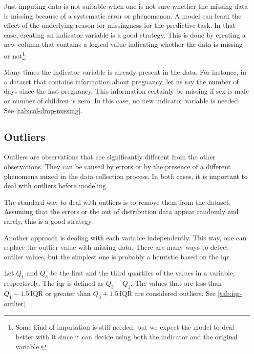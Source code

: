 Just imputing data is not suitable when one is not sure whether the missing data is
missing because of a systematic error or phenomenon.  A model can learn the effect of the
underlying reason for missingness for the predictive task.
In that case, creating an indicator variable is a good strategy.  This is done by creating
a new column that contains a logical value indicating whether the data is missing or
not\footnote{Some kind of imputation is still needed, but we expect the model to deal
better with it since it can decide using both the indicator and the original variable.}.

Many times the indicator variable is already present in the data.  For instance, in a
dataset that contains information about pregnancy, let us say the number of days since
the last pregnancy.  This information certainly be missing if sex is male
or number of children is zero.  In this case, no new indicator variable is needed.
See \cref{tab:col-drop-missing}.

\subsection{Outliers}

Outliers are observations that are significantly different from the other observations.
They can be caused by errors or by the presence of a different phenomena mixed in the data
collection process.  In both cases, it is important to deal with outliers before modeling.

The standard way to deal with outliers is to remove them from the dataset.  Assuming that
the errors or the out of distribution data appear randomly and rarely, this is a good
strategy.

Another approach is dealing with each variable independently.  This way, one can replace
the outlier value with missing data.  There are many ways to detect outlier values, but
the simplest one is probably a heuristic based on the \gls{iqr}.

Let $Q_1$ and $Q_3$ be the first and the third quartiles of the values in a variable,
respectively.  The \gls{iqr} is defined as $Q_3 - Q_1$.  The values that are less than
$Q_1 - 1.5\, \text{IQR}$ or greater than $Q_3 + 1.5\, \text{IQR}$ are considered outliers.
See \cref{tab:iqr-outlier}.

